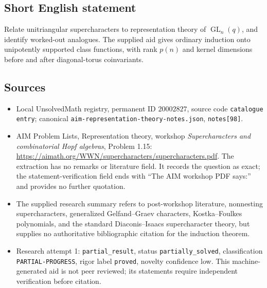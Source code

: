 \documentclass[11pt]{article}
\begin{document}
\subsection{Short English statement}
Relate unitriangular supercharacters to representation theory of $\operatorname{GL}_n(q)$, and identify worked-out analogues. The supplied aid gives ordinary induction onto unipotently supported class functions, with rank $p(n)$ and kernel dimensions before and after diagonal-torus coinvariants.
\subsection{Sources}
\begin{itemize}
\item Local UnsolvedMath registry, permanent ID $20002827$, source code \texttt{catalogue entry}; canonical \texttt{aim-representation-theory-notes.json}, \texttt{notes[98]}.
\item AIM Problem Lists, Representation theory, workshop \emph{Supercharacters and combinatorial Hopf algebras}, Problem 1.15: \url{https://aimath.org/WWN/supercharacters/supercharacters.pdf}. The extraction has no remarks or literature field. It records the question as exact; the statement-verification field ends with ``The AIM workshop PDF says:'' and provides no further quotation.
\item The supplied research summary refers to post-workshop literature, nonnesting supercharacters, generalized Gelfand--Graev characters, Kostka--Foulkes polynomials, and the standard Diaconis--Isaacs supercharacter theory, but supplies no authoritative bibliographic citation for the induction theorem.
\item Research attempt 1: \texttt{partial\_result}, status \texttt{partially\_solved}, classification \texttt{PARTIAL-PROGRESS}, rigor label \texttt{proved}, novelty confidence low. This machine-generated aid is not peer reviewed; its statements require independent verification before citation.
\end{itemize}
\end{document}
